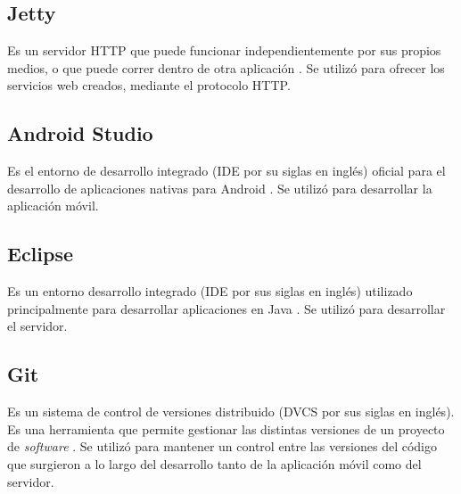 \subsection{Jetty}
Es un servidor HTTP que puede funcionar independientemente por sus propios medios, o que puede correr dentro de otra aplicación \cite{JTY1}. Se utilizó para ofrecer los servicios web creados, mediante el protocolo HTTP.

\subsection{Android Studio}
Es el entorno de desarrollo integrado (IDE por su siglas en inglés) oficial para el desarrollo de aplicaciones nativas para Android \cite{ASD1}. Se utilizó para desarrollar la aplicación móvil.

\subsection{Eclipse}
Es un entorno desarrollo integrado (IDE por sus siglas en inglés) utilizado principalmente para desarrollar aplicaciones en Java \cite{ECL1}. Se utilizó para desarrollar el servidor.

\subsection{Git}
Es un sistema de control de versiones distribuido (DVCS por sus siglas en inglés). Es una herramienta que permite gestionar las distintas versiones de un proyecto de \textit{software} \cite{GIT1}. Se utilizó para mantener un control entre las versiones del código que surgieron a lo largo del desarrollo tanto de la aplicación móvil como del servidor.
